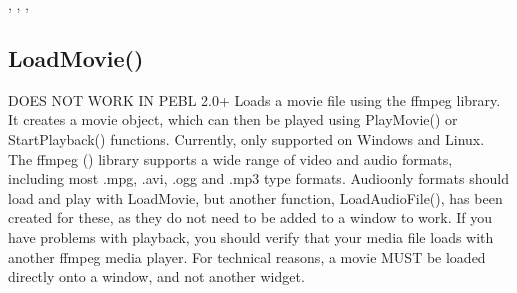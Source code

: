 \documentclass[letterpaper,10pt,english]{sphinxmanual}
\begin{document}
\sphinxAtStartPar
{}

\sphinxAtStartPar
{}, , , 

\ignorespaces 

\subsection{LoadMovie()}
\label{\detokenize{reference/peblobjects:loadmovie}}\label{\detokenize{reference/peblobjects:index-18}}
\sphinxAtStartPar
{}

\sphinxAtStartPar
{}

\sphinxAtStartPar
DOES NOT WORK IN PEBL 2.0+    Loads a movie file using the ffmpeg library.  It creates a movie object, which can then be played using PlayMovie() or StartPlayback() functions.  Currently, only supported on Windows and Linux.  The ffmpeg () library supports a wide range of video and audio formats, including most .mpg, .avi, .ogg and .mp3 type formats.  Audio\sphinxhyphen{}only formats should load and play with LoadMovie, but another function, LoadAudioFile(), has been created for these, as they do not need to be added to a window to work.  If you have problems with playback,  you should verify that your media file loads with another ffmpeg media player.  For technical reasons, a movie MUST be loaded directly onto a window, and not another widget.

\sphinxAtStartPar
{}

\begin{sphinxVerbatim}[commandchars=\\\{\}]
\end{sphinxVerbatim}

\sphinxAtStartPar
{}

\begin{sphinxVerbatim}[commandchars=\\\{\}]
\end{sphinxVerbatim}
\end{document}
